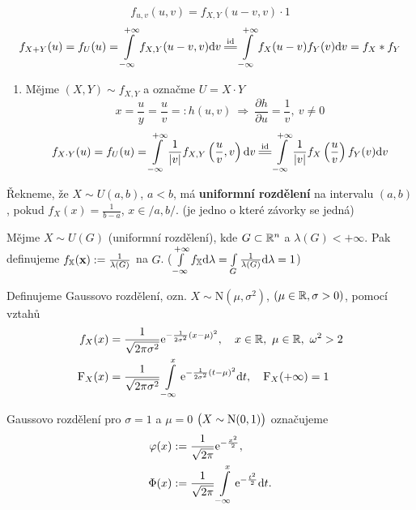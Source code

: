 \begin{dusl}
\begin{enumerate}[c2)]
	$$ f_{u,v}(u,v)=f_{X,Y}(u-v,v)\cdot 1 $$
	$$ f_{X+Y}(u)=f_U(u)=\int\limits_{-\infty}^{+\infty} f_{X,Y}(u-v,v)\dif v\equal{\text{id}}\int\limits_{-\infty}^{+\infty} f_X(u-v)f_Y(v)\dif v=f_X \ast f_Y $$
\end{enumerate}
\begin{enumerate}[c3)]
	\item Mějme $(X,Y)\sim f_{X,Y} $ a označme  $ U=X\cdot Y$ $$ x=\frac{u}{y}=\frac{u}{v}=:h(u,v)~\Rightarrow~ \frac{\partial h}{\partial u}=\frac{1}{v},~v\neq 0 $$
	$$f_{X\cdot Y}(u)= f_U(u)=\int\limits_{-\infty}^{+\infty} \frac{1}{|v|}f_{X,Y}\left(\frac{u}{v},v\right)\dif v\equal{\text{id}}\int\limits_{-\infty}^{+\infty} \frac{1}{|v|}f_X\left( \frac{u}{v} \right)f_Y(v)\dif v $$
\end{enumerate}
\end{dusl}
\begin{define}
	Řekneme, že $X\sim U(a,b)$, $a<b$, má\textbf{ uniformní rozdělení} na intervalu $(a,b)$, pokud $f_X(x)=\frac{1}{b-a}$, $x\in/a,b/$. (je jedno o které závorky se jedná)
\end{define}	
\begin{define}
	Mějme $X\sim U(G)$ (uniformní rozdělení), kde $G\subset \mathbb{R}^n$ a $\lambda(G)<+\infty$. Pak definujeme $f_{\mathbb{X}}(\textbf{x}):=\frac{1}{\lambda(G)}$ na $G$. ($\int\limits_{-\infty}^{+\infty}f_{\mathbb{X}} \mathrm{d}\lambda=\int\limits_{G}\frac{1}{\lambda(G)}\mathrm{d}\lambda=1$)
\end{define}
\begin{define}
	Definujeme Gaussovo rozdělení, ozn. $X\sim \mathrm{N}(\mu,\sigma^2)$, $(\mu\in\mathbb{R},\sigma>0)$, pomocí vztahů  \[
	\begin{split}
	f_X(x)&=\frac{1}{\sqrt{2 \pi\sigma^2}}\mathrm{e}^{-\frac{1}{2 \sigma^2}(x-\mu)^2},~~~ x\in\mathbb{R},~\mu\in\mathbb{R},~\omega^2>2 \\  \mathrm{F}_X(x)&=\frac{1}{\sqrt{2 \pi\sigma^2}}\int\limits_{-\infty}^x \mathrm{e}^{-\frac{1}{2 \sigma^2}(t-\mu)^2} \mathrm{d} t,~~~ \mathrm{F}_X(+\infty)=1
	\end{split}
	\]
\end{define}
\begin{define}
	Gaussovo rozdělení pro $\sigma=1$ a $\mu=0$ $\bigl(X\sim \mathrm{N}(0,1)\bigr)$ označujeme
	\[
	\begin{split}
	\varphi(x)&:=\frac{1}{\sqrt{2 \pi}}\mathrm{e}^{-\frac{x^2}{2 }}, \\
	\Phi(x)&:=\frac{1}{\sqrt{2\pi}}\int\limits_{-\infty}^x \mathrm{e}^{-\frac{t^2}{2}}\mathrm{d} t.
	\end{split}
	\]
\end{define}
